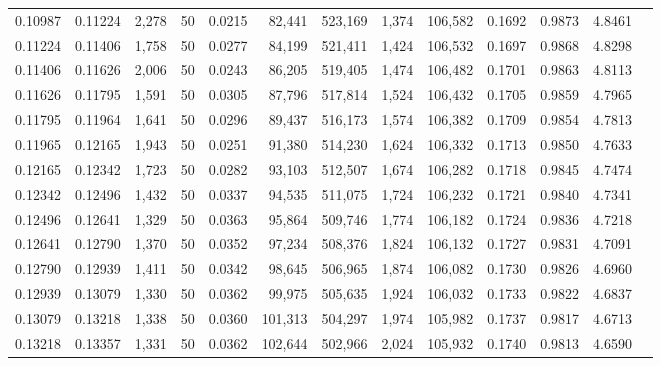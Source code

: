 \begin{tabular}{rrrrrrrrrrrrr}
0.10987 & 0.11224 & 2,278 &  50 &                                     0.0215 &  82,441 & 523,169 &   1,374 & 106,582 & 0.1692 & 0.9873 & 4.8461 \\
0.11224 & 0.11406 & 1,758 &  50 &                                     0.0277 &  84,199 & 521,411 &   1,424 & 106,532 & 0.1697 & 0.9868 & 4.8298 \\
0.11406 & 0.11626 & 2,006 &  50 &                                     0.0243 &  86,205 & 519,405 &   1,474 & 106,482 & 0.1701 & 0.9863 & 4.8113 \\
0.11626 & 0.11795 & 1,591 &  50 &                                     0.0305 &  87,796 & 517,814 &   1,524 & 106,432 & 0.1705 & 0.9859 & 4.7965 \\
0.11795 & 0.11964 & 1,641 &  50 &                                     0.0296 &  89,437 & 516,173 &   1,574 & 106,382 & 0.1709 & 0.9854 & 4.7813 \\
0.11965 & 0.12165 & 1,943 &  50 &                                     0.0251 &  91,380 & 514,230 &   1,624 & 106,332 & 0.1713 & 0.9850 & 4.7633 \\
0.12165 & 0.12342 & 1,723 &  50 &                                     0.0282 &  93,103 & 512,507 &   1,674 & 106,282 & 0.1718 & 0.9845 & 4.7474 \\
0.12342 & 0.12496 & 1,432 &  50 &                                     0.0337 &  94,535 & 511,075 &   1,724 & 106,232 & 0.1721 & 0.9840 & 4.7341 \\
0.12496 & 0.12641 & 1,329 &  50 &                                     0.0363 &  95,864 & 509,746 &   1,774 & 106,182 & 0.1724 & 0.9836 & 4.7218 \\
0.12641 & 0.12790 & 1,370 &  50 &                                     0.0352 &  97,234 & 508,376 &   1,824 & 106,132 & 0.1727 & 0.9831 & 4.7091 \\
0.12790 & 0.12939 & 1,411 &  50 &                                     0.0342 &  98,645 & 506,965 &   1,874 & 106,082 & 0.1730 & 0.9826 & 4.6960 \\
0.12939 & 0.13079 & 1,330 &  50 &                                     0.0362 &  99,975 & 505,635 &   1,924 & 106,032 & 0.1733 & 0.9822 & 4.6837 \\
0.13079 & 0.13218 & 1,338 &  50 &                                     0.0360 & 101,313 & 504,297 &   1,974 & 105,982 & 0.1737 & 0.9817 & 4.6713 \\
0.13218 & 0.13357 & 1,331 &  50 &                                     0.0362 & 102,644 & 502,966 &   2,024 & 105,932 & 0.1740 & 0.9813 & 4.6590 \\

\end{tabular}
